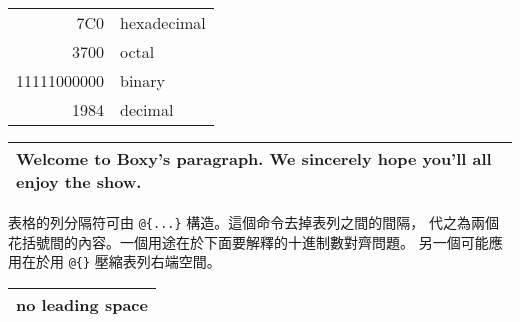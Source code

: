 \begin{example}
\begin{tabular}{|r|l|}
\hline
7C0 & hexadecimal \\
3700 & octal \\ \cline{2-2}
11111000000 & binary \\
\hline \hline
1984 & decimal \\
\hline
\end{tabular}
\end{example}

\begin{example}
\begin{tabular}{|p{4.7cm}|}
\hline
Welcome to Boxy's paragraph.
We sincerely hope you'll
all enjoy the show.\\
\hline
\end{tabular}
\end{example}

表格的列分隔符可由 \verb|@{...}| 構造。這個命令去掉表列之間的間隔，
代之為兩個花括號間的內容。一個用途在於下面要解釋的十進制數對齊問題。
另一個可能應用在於用 \verb|@{}| 壓縮表列右端空間。

\begin{example}
\begin{tabular}{@{} l @{}}
\hline
no leading space\\
\hline
\end{tabular}
\end{example}

